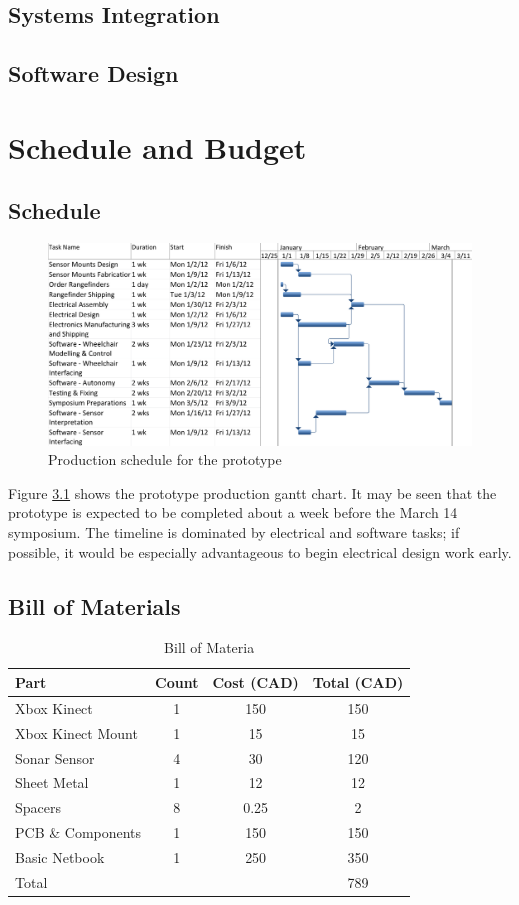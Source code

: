 \documentclass[oneside,final]{report}
\begin{document}
\section{Systems Integration}

\section{Software Design}

\chapter{Schedule and Budget}

\section{Schedule}
\begin{figure}[htb]
 \centering
 \includegraphics[scale=0.6]{gantt.png}
 \caption{Production schedule for the prototype}
 \label{schedule}
\end{figure}

Figure \ref{schedule} shows the prototype production gantt chart.  It may be seen that the prototype is expected to be completed about a week before the March 14 symposium.  The timeline is dominated by electrical and software tasks; if possible, it would be especially advantageous to begin electrical design work early.

\section{Bill of Materials}
\begin{table}[t]
\centering
\begin{tabular}{|l|c|c|c|}
\hline
Part & Count & Cost (CAD) & Total (CAD) \\
\hline
Xbox Kinect & 1 & 150 & 150 \\
\hline
Xbox Kinect Mount & 1& 15 & 15 \\
Sonar Sensor & 4 & 30 & 120 \\
\hline
Sheet Metal & 1 & 12 & 12 \\
\hline
Spacers & 8 & 0.25 & 2 \\
\hline
PCB \& Components & 1 & 150 & 150 \\
\hline
Basic Netbook & 1 & 250 & 350 \\
\hline
\hline
Total&&&789\\
\hline
\end{tabular}
\caption{Bill of Materia}
\label{tab:BOM}
\end{table}
\end{document}
